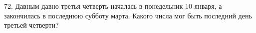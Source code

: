 72. Давным-давно третья четверть началась в понедельник 10 января, а закончилась в последнюю субботу марта. Какого числа мог быть последний день третьей четверти?\\
